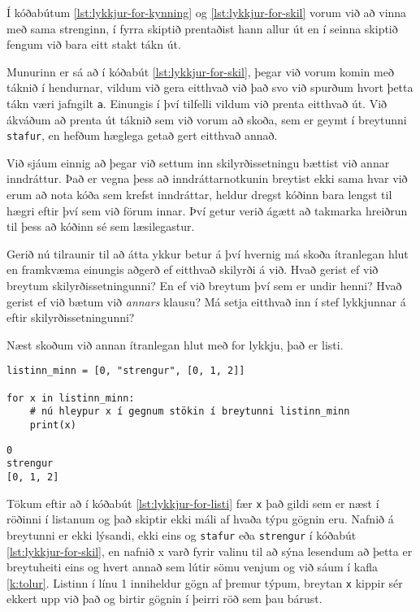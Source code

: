 Í kóðabútum \ref{lst:lykkjur-for-kynning} og \ref{lst:lykkjur-for-skil} vorum við að vinna með sama strenginn, í fyrra skiptið prentaðist hann allur út en í seinna skiptið fengum við bara eitt stakt tákn út.

Munurinn er sá að í kóðabút \ref{lst:lykkjur-for-skil}, þegar við vorum komin með táknið í hendurnar, vildum við gera eitthvað við það svo við spurðum hvort þetta tákn væri jafngilt \texttt{a}.
Einungis í því tilfelli vildum við prenta eitthvað út.
Við ákváðum að prenta út táknið sem við vorum að skoða, sem er geymt í breytunni \texttt{stafur}, en hefðum hæglega getað gert eitthvað annað.

Við sjáum einnig að þegar við settum inn skilyrðissetningu bættist við annar inndráttur.
Það er vegna þess að inndráttarnotkunin breytist ekki sama hvar við erum að nota kóða sem krefst inndráttar, heldur dregst kóðinn bara lengst til hægri eftir því sem við förum innar. 
Því getur verið ágætt að takmarka hreiðrun til þess að kóðinn sé sem læsilegastur.

Gerið nú tilraunir til að átta ykkur betur á því hvernig má skoða ítranlegan hlut en framkvæma einungis aðgerð ef eitthvað skilyrði á við.
Hvað gerist ef við breytum skilyrðissetningunni?
En ef við breytum því sem er undir henni?
Hvað gerist ef við bætum við \textit{annars} klausu?
Má setja eitthvað inn í stef lykkjunnar á eftir skilyrðissetningunni?

Næst skoðum við annan ítranlegan hlut með for lykkju, það er listi.

\lstset{style=venjulegt}	
	
\begin{lstlisting}[caption=For lykkja með lista, label=lst:lykkjur-for-listi]
listinn_minn = [0, "strengur", [0, 1, 2]]

for x in listinn_minn:
	# nú hleypur x í gegnum stökin í breytunni listinn_minn
	print(x)

\end{lstlisting}
\lstset{style=uttak}
\begin{lstlisting}	
0
strengur
[0, 1, 2]
\end{lstlisting}



\lstset{style=venjulegt}

Tökum eftir að í kóðabút \ref{lst:lykkjur-for-listi} fær \texttt{x} það gildi sem er næst í röðinni í listanum og það skiptir ekki máli af hvaða týpu gögnin eru.
Nafnið á breytunni er ekki lýsandi, ekki eins og \texttt{stafur} eða \texttt{strengur} í kóðabút \ref{lst:lykkjur-for-skil}, en nafnið x varð fyrir valinu til að sýna lesendum að þetta er breytuheiti eins og hvert annað sem lútir sömu venjum og við sáum í kafla \ref{k:tolur}.
Listinn í línu 1 inniheldur gögn af þremur týpum, breytan \texttt{x} kippir sér ekkert upp við það og birtir gögnin í þeirri röð sem þau bárust.

